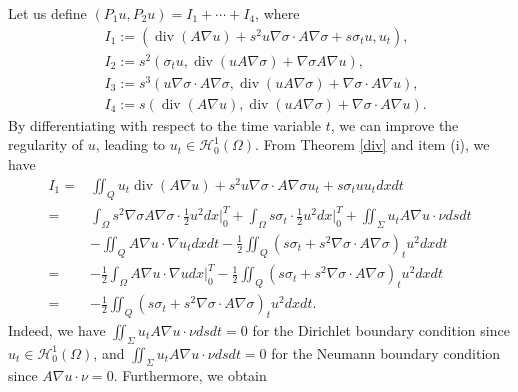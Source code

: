 \documentclass[9pt,reqno]{amsart}
\theoremstyle{plain}
\numberwithin{equation}{section}
\numberwithin{theorem}{section}
\def\Om{\Omega}
\DeclareMathOperator*{\Div}{\mathrm{div}}
\def\Om{\Omega}
\begin{document}
	Let us define $\left(P_1 u, P_2 u\right)=I_1+\cdots+I_4$, where
	\begin{equation*}
		\begin{split}
			& I_1:=\left(\Div(A \nabla u)+s^2 u \nabla \sigma \cdot A \nabla \sigma+s \sigma_t u, u_t\right), \\
			& I_2:=s^2\left(\sigma_t u, \Div(u A \nabla \sigma)+\nabla \sigma A \nabla u\right), \\
			&I_3:=s^3\left( u \nabla \sigma \cdot A \nabla \sigma, \Div(u A \nabla \sigma)+\nabla \sigma \cdot A \nabla u\right),\\
			& I_4:=s(\Div(A \nabla u), \Div(u A \nabla \sigma)+\nabla \sigma \cdot A \nabla u).
		\end{split}
	\end{equation*}
	By differentiating with respect to the time variable $t$, we can improve the regularity of $u$, leading to $u_t \in \mathcal{H}_0^1(\Omega)$. From Theorem \ref{div} and item (i), we have
	\begin{equation}\label{I11}
		\begin{split}
			I_1=&\iint_Q u_t \Div (A\nabla u) +s^2 u \nabla \sigma \cdot A\nabla \sigma u_t + s\sigma_t u u_t dx  dt\\
			=&\int_{\Om} s^2  \nabla \sigma A\nabla \sigma\cdot \frac{1}{2}u^2 dx  \bigg|_0^T + \int_{\Om} s\sigma_t\cdot \frac{1}{2}u^2 dx  \bigg|_0^T+ \iint_\Sigma u_t A\nabla u \cdot \nu ds dt\\
			&-\iint_{Q}  A\nabla u \cdot \nabla u_t dx  dt -\frac{1}{2}\iint_{Q}(s\sigma_t + s^2 \nabla \sigma \cdot A\nabla \sigma)_t u^2 dx  dt\\
			=& - \frac{1}{2}\int_{\Om}  A\nabla u \cdot \nabla u dx  \bigg|_0^T -\frac{1}{2}\iint_{Q}(s\sigma_t + s^2 \nabla \sigma \cdot A\nabla \sigma)_t u^2 dx  dt\\
			=& -\frac{1}{2}\iint_{Q}(s\sigma_t + s^2 \nabla \sigma \cdot A\nabla \sigma)_t u^2 dx  dt.
		\end{split}
	\end{equation}
	Indeed, we have $\iint_\Sigma u_t A\nabla u \cdot \nu ds dt=0$ for the Dirichlet boundary condition since $u_t \in \mathcal{H}_0^1(\Omega)$, and $\iint_\Sigma u_t A\nabla u \cdot \nu ds dt=0$ for the Neumann boundary condition since $A\nabla u\cdot \nu=0$. Furthermore, we obtain
\end{document}
